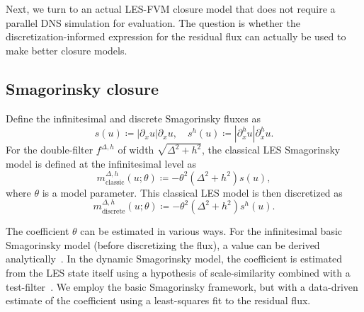 \documentclass[preprint,twocolumn,5p]{elsarticle}
\begin{document}
Next, we turn to an actual LES-FVM closure model that does not require a parallel
DNS simulation for evaluation. The question is whether the
discretization-informed expression for the residual flux can actually be
used to make better closure models.

\subsection{Smagorinsky closure}
\label{sec:burgers-smagorinsky}

Define the infinitesimal and discrete Smagorinsky fluxes as
\begin{equation}
    s(u) \coloneq \left| \partial_x u \right| \partial_x u, \quad
    s^h(u) \coloneq \left| \partial^h_x u \right| \partial^h_x u.
\end{equation}
For the double-filter $f^{\Delta, h}$ of width $\sqrt{\Delta^2 + h^2}$,
the classical LES Smagorinsky model is defined at the infinitesimal level as
\begin{equation}
    m^{\Delta, h}_\text{classic}(u; \theta)
    \coloneq -\theta^2 (\Delta^2 + h^2) s(u),
\end{equation}
where $\theta$ is a model parameter.
This classical LES model is then discretized as
\begin{equation}
m^{\Delta, h}_\text{discrete}(u; \theta) \coloneq
-\theta^2 (\Delta^2 + h^2) s^h(u).
\end{equation}

The coefficient $\theta$ can be estimated in various ways.
For the infinitesimal basic Smagorinsky model (before discretizing the flux),
a value can be derived analytically~\cite{lillyRepresentationSmallscaleTurbulence1966}.
In the dynamic Smagorinsky model, the coefficient is estimated from 
the LES state itself using a hypothesis of scale-similarity combined with a
test-filter~\cite{germanoDynamicSubgridscaleEddy1991}.
We employ the basic Smagorinsky framework, but with a data-driven estimate of
the coefficient using a least-squares fit to the residual flux.
\end{document}
